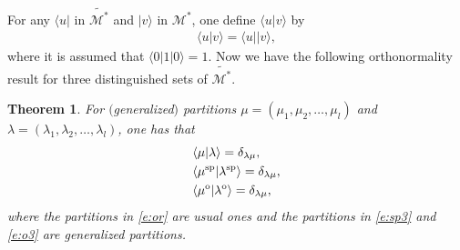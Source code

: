 \documentclass[pdftex]{sigma}
\numberwithin{equation}{section}
\newtheorem{Theorem}{Theorem}[section]
\begin{document}
For any $\langle u|$ in $\widetilde{\mathcal{M}^*}$ and $|v\rangle$ in $\mathcal{M}^*$, one define $\langle u|v\rangle$ by
 \begin{align*}
 \langle u|v\rangle=\langle u||v\rangle,
 \end{align*}
 where it is assumed that $\langle 0|1|0\rangle=1$. Now we have the following orthonormality result for three distinguished sets of $\widetilde{\mathcal{M}^*}$.
\begin{Theorem}\label{th2}
For $($generalized$)$ partitions $\mu=(\mu_1,\mu_2,\dots,\mu_l)$ and $\lambda=(\lambda_1,\lambda_2,\dots,\lambda_l)$, one has that
\begin{align}
\label{e:or}&\langle \mu|\lambda\rangle=\delta_{\lambda\mu},\\
\label{e:sp3}&\langle \mu^{\rm sp}|\lambda^{\rm sp}\rangle=\delta_{\lambda\mu},\\
\label{e:o3}&\langle \mu^{\rm o}|\lambda^{\rm o}\rangle=\delta_{\lambda\mu},
\end{align}
where the partitions in \eqref{e:or} are usual ones and the partitions in \eqref{e:sp3} and \eqref{e:o3} are
generalized partitions.
\end{Theorem}
\end{document}
